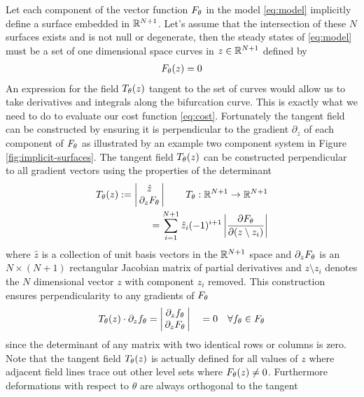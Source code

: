 Let each component of the vector function $F_{\theta}$ in the model \eqref{eq:model} implicitly define a surface embedded in $\mathbb{R}^{N+1}$. Let's assume that the intersection of these $N$ surfaces exists and is not null or degenerate, then the steady states of \eqref{eq:model} must be a set of one dimensional space curves in $z\in\mathbb{R}^{N+1}$ defined by
\begin{align}
    F_{\theta}(z) = 0
\end{align}
An expression for the field $T_{\theta}(z)$ tangent to the set of curves would allow us to take derivatives and integrals along the bifurcation curve. This is exactly what we need to do to evaluate our cost function \ref{eq:cost}. Fortunately the tangent field can be constructed by ensuring it is perpendicular to the gradient $\partial_z$ of each component of $F_{\theta}$ as illustrated by an example two component system in Figure \ref{fig:implicit-surfaces}. The tangent field $T_{\theta}(z)$ can be constructed perpendicular to all gradient vectors using the properties of the determinant \cite{Goldman2005CurvatureSurfaces}
\begin{align}
    T_{\theta}(z):=
    \label{eq:tangent-field}
    \left|\begin{matrix}
        \hat{z} \\
        \,\partial_{z}F_{\theta}\,
    \end{matrix}\right|
    \qquad T_{\theta} : \mathbb{R}^{N+1}\rightarrow\mathbb{R}^{N+1}\\
    =\sum_{i=1}^{N+1}\hat{z}_{i}(-1)^{i+1} \left|\frac{\partial F_{\theta}}{\partial(z\setminus z_{i}) }\right|
\end{align}
where $\hat{z}$ is a collection of unit basis vectors in the $\mathbb{R}^{N+1}$ space and $\partial_{z}F_{\theta}$ is an $N\times(N+1)$ rectangular Jacobian matrix of partial derivatives and $z\setminus z_{i}$ denotes the $N$ dimensional vector $z$ with component $z_{i}$ removed. This construction ensures perpendicularity to any gradients of $F_{\theta}$
\begin{align}
    T_{\theta}(z)\cdot\partial_z f_{\theta} =
    \left|\begin{matrix}
        \partial_z f_{\theta} \\
        \,\partial_{z}F_{\theta}\,
    \end{matrix}\right|
    \quad =0 \quad\forall f_{\theta}\in F_{\theta}
\end{align}
since the determinant of any matrix with two identical rows or columns is zero. Note that the tangent field $T_{\theta}(z)$ is actually defined for all values of $z$ where adjacent field lines trace out other level sets where $F_{\theta}(z)\neq0$. Furthermore deformations with respect to $\theta$ are always orthogonal to the tangent
